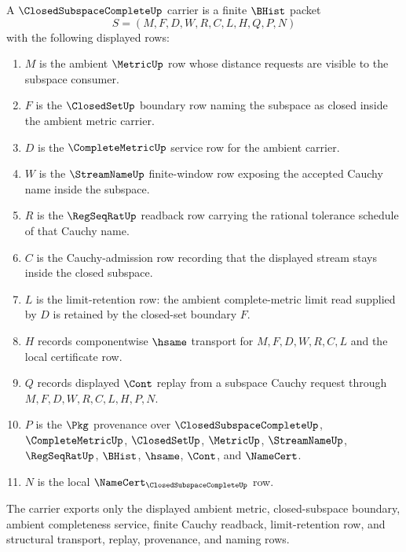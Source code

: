\begin{definition}
\label{def:closed-subspace-complete-carrier}
A $\ClosedSubspaceCompleteUp$ carrier is a finite $\BHist$ packet
$$
S=(M,F,D,W,R,C,L,H,Q,P,N)
$$
with the following displayed rows:
\begin{enumerate}
\item $M$ is the ambient $\MetricUp$ row whose distance requests are visible to the subspace consumer.
\item $F$ is the $\ClosedSetUp$ boundary row naming the subspace as closed inside the ambient metric carrier.
\item $D$ is the $\CompleteMetricUp$ service row for the ambient carrier.
\item $W$ is the $\StreamNameUp$ finite-window row exposing the accepted Cauchy name inside the subspace.
\item $R$ is the $\RegSeqRatUp$ readback row carrying the rational tolerance schedule of that Cauchy name.
\item $C$ is the Cauchy-admission row recording that the displayed stream stays inside the closed subspace.
\item $L$ is the limit-retention row: the ambient complete-metric limit read supplied by $D$ is retained by the closed-set boundary $F$.
\item $H$ records componentwise $\hsame$ transport for $M,F,D,W,R,C,L$ and the local certificate row.
\item $Q$ records displayed $\Cont$ replay from a subspace Cauchy request through $M,F,D,W,R,C,L,H,P,N$.
\item $P$ is the $\Pkg$ provenance over $\ClosedSubspaceCompleteUp$, $\CompleteMetricUp$, $\ClosedSetUp$, $\MetricUp$, $\StreamNameUp$, $\RegSeqRatUp$, $\BHist$, $\hsame$, $\Cont$, and $\NameCert$.
\item $N$ is the local $\NameCert_{\ClosedSubspaceCompleteUp}$ row.
\end{enumerate}
The carrier exports only the displayed ambient metric, closed-subspace boundary, ambient completeness service, finite Cauchy readback, limit-retention row, and structural transport, replay, provenance, and naming rows.
\end{definition}

